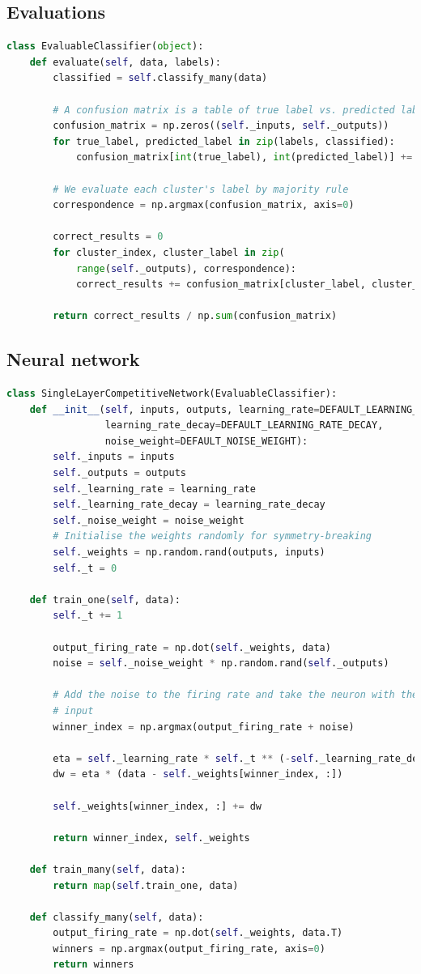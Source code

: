 \documentclass[a4paper, 11pt, twocolumn, draft]{article} %
\begin{document}
\subsection{Evaluations}
\begin{lstlisting}[language=Python, style=python]
class EvaluableClassifier(object):
    def evaluate(self, data, labels):
        classified = self.classify_many(data)

        # A confusion matrix is a table of true label vs. predicted label.
        confusion_matrix = np.zeros((self._inputs, self._outputs))
        for true_label, predicted_label in zip(labels, classified):
            confusion_matrix[int(true_label), int(predicted_label)] += 1

        # We evaluate each cluster's label by majority rule
        correspondence = np.argmax(confusion_matrix, axis=0)

        correct_results = 0
        for cluster_index, cluster_label in zip(
            range(self._outputs), correspondence):
            correct_results += confusion_matrix[cluster_label, cluster_index]

        return correct_results / np.sum(confusion_matrix)
\end{lstlisting}

\subsection{Neural network}
\begin{lstlisting}[language=Python, style=python]
class SingleLayerCompetitiveNetwork(EvaluableClassifier):
    def __init__(self, inputs, outputs, learning_rate=DEFAULT_LEARNING_RATE,
                 learning_rate_decay=DEFAULT_LEARNING_RATE_DECAY,
                 noise_weight=DEFAULT_NOISE_WEIGHT):
        self._inputs = inputs
        self._outputs = outputs
        self._learning_rate = learning_rate
        self._learning_rate_decay = learning_rate_decay
        self._noise_weight = noise_weight
        # Initialise the weights randomly for symmetry-breaking
        self._weights = np.random.rand(outputs, inputs)
        self._t = 0

    def train_one(self, data):
        self._t += 1

        output_firing_rate = np.dot(self._weights, data)
        noise = self._noise_weight * np.random.rand(self._outputs)

        # Add the noise to the firing rate and take the neuron with the largest
        # input
        winner_index = np.argmax(output_firing_rate + noise)

        eta = self._learning_rate * self._t ** (-self._learning_rate_decay)
        dw = eta * (data - self._weights[winner_index, :])

        self._weights[winner_index, :] += dw

        return winner_index, self._weights

    def train_many(self, data):
        return map(self.train_one, data)

    def classify_many(self, data):
        output_firing_rate = np.dot(self._weights, data.T)
        winners = np.argmax(output_firing_rate, axis=0)
        return winners
\end{lstlisting}
\end{document}
